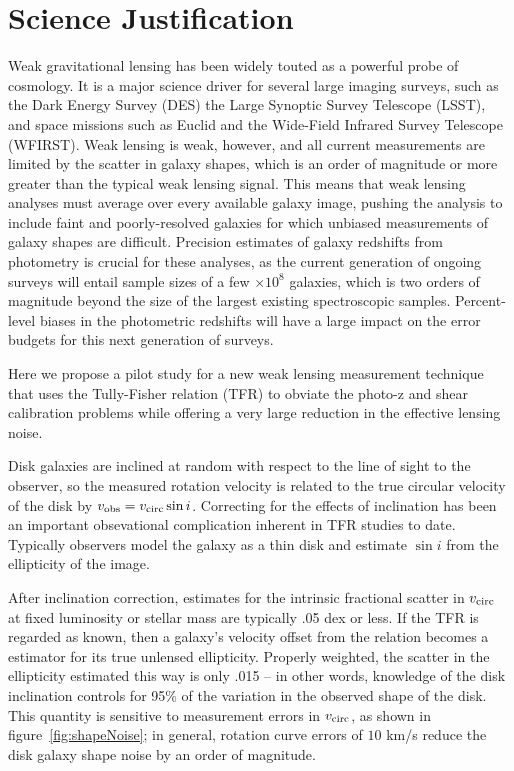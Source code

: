 \documentclass[11pt,preprint]{aastex}
\begin{document}

\section{Science Justification}
\citet{Morales2006}

Weak gravitational lensing has been widely touted as a powerful probe of cosmology. It is a major science driver for several large imaging surveys, such as the Dark Energy Survey (DES) the Large Synoptic Survey Telescope (LSST), and space missions such as Euclid and the Wide-Field Infrared Survey Telescope (WFIRST). Weak lensing is weak, however, and all current measurements are limited by the scatter in galaxy shapes, which is an order of magnitude or more greater than the typical weak lensing signal. This means that weak lensing analyses must average over every available galaxy image, pushing the analysis to include faint and poorly-resolved galaxies for which unbiased measurements of galaxy shapes are difficult. Precision estimates of galaxy redshifts from photometry is crucial for these analyses, as the current generation of ongoing surveys will entail sample sizes of a few $\times10^8$ galaxies, which is two orders of magnitude beyond the size of the largest existing spectroscopic samples. Percent-level biases in the photometric redshifts will have a large impact on the error budgets for this next generation of surveys.

Here we propose a pilot study for a new weak lensing measurement technique that uses the Tully-Fisher relation (TFR) to obviate the photo-z and shear calibration problems while offering a very large reduction in the effective lensing noise.

Disk galaxies are inclined at random with respect to the line of sight to the observer, so the measured rotation velocity is related to the true circular velocity of the disk by $v_{\rm obs} = v_{\rm circ} \sin i$. Correcting for the effects of inclination has been an important obsevational complication inherent in TFR studies to date. Typically observers model the galaxy as a thin disk and estimate $\sin i$ from the ellipticity of the image.

After inclination correction, estimates for the intrinsic fractional scatter in $v_{\rm circ}$ at fixed luminosity or stellar mass are typically .05 dex or less. If the TFR is regarded as known, then a galaxy's velocity offset from the relation becomes a estimator for its true unlensed ellipticity. Properly weighted, the scatter in the ellipticity estimated this way is only .015 -- in other words, knowledge of the disk inclination controls for 95\% of the variation in the observed shape of the disk. This quantity is sensitive to measurement errors in $v_{\rm circ}$, as shown in figure~\ref{fig:shapeNoise}; in general, rotation curve errors of $10 $ km/s reduce the disk galaxy shape noise by an order of magnitude.
\end{document}
